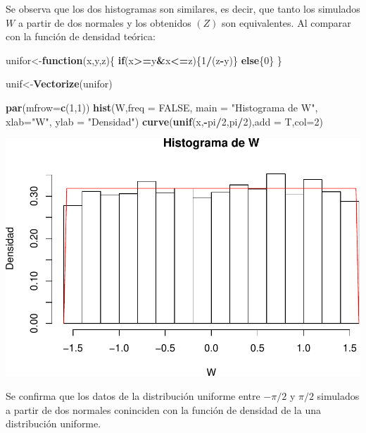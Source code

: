 \documentclass[]{article}
\newenvironment{Shaded}{\begin{snugshade}}{\end{snugshade}}
\newcommand{\KeywordTok}[1]{\textcolor[rgb]{0.13,0.29,0.53}{\textbf{#1}}}
\newcommand{\DataTypeTok}[1]{\textcolor[rgb]{0.13,0.29,0.53}{#1}}
\newcommand{\DecValTok}[1]{\textcolor[rgb]{0.00,0.00,0.81}{#1}}
\newcommand{\StringTok}[1]{\textcolor[rgb]{0.31,0.60,0.02}{#1}}
\newcommand{\OtherTok}[1]{\textcolor[rgb]{0.56,0.35,0.01}{#1}}
\newcommand{\ControlFlowTok}[1]{\textcolor[rgb]{0.13,0.29,0.53}{\textbf{#1}}}
\newcommand{\OperatorTok}[1]{\textcolor[rgb]{0.81,0.36,0.00}{\textbf{#1}}}
\newcommand{\NormalTok}[1]{#1}
\begin{document}
Se observa que los dos histogramas son similares, es decir, que tanto
los simulados \(W\) a partir de dos normales y los obtenidos \((Z)\) son
equivalentes. Al comparar con la función de densidad teórica:

\begin{Shaded}
\begin{Highlighting}[]
\NormalTok{unifor<-}\ControlFlowTok{function}\NormalTok{(x,y,z)\{}
  \ControlFlowTok{if}\NormalTok{(x}\OperatorTok{>=}\NormalTok{y}\OperatorTok{&}\NormalTok{x}\OperatorTok{<=}\NormalTok{z)\{}\DecValTok{1}\OperatorTok{/}\NormalTok{(z}\OperatorTok{-}\NormalTok{y)\}}
  \ControlFlowTok{else}\NormalTok{\{}\DecValTok{0}\NormalTok{\}}
\NormalTok{\}}

\NormalTok{unif<-}\KeywordTok{Vectorize}\NormalTok{(unifor)}

\KeywordTok{par}\NormalTok{(}\DataTypeTok{mfrow=}\KeywordTok{c}\NormalTok{(}\DecValTok{1}\NormalTok{,}\DecValTok{1}\NormalTok{))}
\KeywordTok{hist}\NormalTok{(W,}\DataTypeTok{freq =} \OtherTok{FALSE}\NormalTok{, }\DataTypeTok{main =} \StringTok{"Histograma de W"}\NormalTok{, }\DataTypeTok{xlab=}\StringTok{"W"}\NormalTok{, }\DataTypeTok{ylab =} \StringTok{"Densidad"}\NormalTok{)}
\KeywordTok{curve}\NormalTok{(}\KeywordTok{unif}\NormalTok{(x,}\OperatorTok{-}\NormalTok{pi}\OperatorTok{/}\DecValTok{2}\NormalTok{,pi}\OperatorTok{/}\DecValTok{2}\NormalTok{),}\DataTypeTok{add =}\NormalTok{ T,}\DataTypeTok{col=}\DecValTok{2}\NormalTok{)}
\end{Highlighting}
\end{Shaded}

\includegraphics[width=0.7\linewidth]{notebook_simulaciones_files/figure-latex/unnamed-chunk-9-1}

Se confirma que los datos de la distribución uniforme entre \(-\pi/2\) y
\(\pi/2\) simulados a partir de dos normales coninciden con la función
de densidad de la una distribución uniforme.
\end{document}
